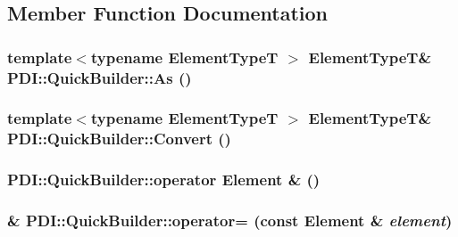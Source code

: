 \subsection{Member Function Documentation}
\hypertarget{class_p_d_i_1_1_quick_builder_a67ad86ef14a3930ad09a2792a04a13c}{
\subsubsection[{As}]{\setlength{\rightskip}{0pt plus 5cm}template$<$typename ElementTypeT $>$ ElementTypeT\& PDI::QuickBuilder::As ()}}
\label{class_p_d_i_1_1_quick_builder_a67ad86ef14a3930ad09a2792a04a13c}


\hypertarget{class_p_d_i_1_1_quick_builder_d7bc7472db091662a038487e56df4072}{
\subsubsection[{Convert}]{\setlength{\rightskip}{0pt plus 5cm}template$<$typename ElementTypeT $>$ ElementTypeT\& PDI::QuickBuilder::Convert ()}}
\label{class_p_d_i_1_1_quick_builder_d7bc7472db091662a038487e56df4072}


\hypertarget{class_p_d_i_1_1_quick_builder_fcf3218c14c5a4d5ac251a9e0f267d92}{
\subsubsection[{operator Element \&}]{\setlength{\rightskip}{0pt plus 5cm}PDI::QuickBuilder::operator {\bf Element} \& ()}}
\label{class_p_d_i_1_1_quick_builder_fcf3218c14c5a4d5ac251a9e0f267d92}


\hypertarget{class_p_d_i_1_1_quick_builder_a6fc28dc8c764f697e06aa48d34b32ea}{
\subsubsection[{operator=}]{\& PDI::QuickBuilder::operator= (const {\bf Element} \& {\em element})}}
\label{class_p_d_i_1_1_quick_builder_a6fc28dc8c764f697e06aa48d34b32ea}


